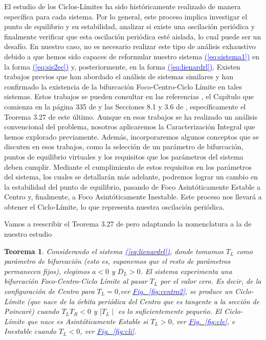 \documentclass[12pt,a4paper]{report} %
\newtheorem{theorem}{Teorema}[chapter]
\newcommand{\fref}[1]{\hyperref[#1]{\textcolor{blue}{Fig.~\ref*{#1}}}}
\newcommand{\eref}[1]{\hyperref[#1]{\textcolor{blue}{(\ref*{#1})}}}
\newcommand{\fref}[1]{\hyperref[#1]{\textcolor{blue}{\textit{Fig.~\ref*{#1}}}}}
\newcommand{\eref}[1]{\hyperref[#1]{\textcolor{blue}{\textit{(\ref*{#1})}}}}
\begin{document}
	\vspace{0.5cm}El estudio de los Ciclos-Límites ha sido históricamente realizado de manera específica para cada sistema. Por lo general, este proceso implica investigar el punto de equilibrio y su estabilidad, analizar si existe una oscilación periódica y finalmente verificar que esta oscilación periódica esté aislada, lo cual puede ser un desafío. En nuestro caso, no es necesario realizar este tipo de análisis exhaustivo debido a que hemos sido capaces de reformular nuestro sistema \eref{eq:sistema1} en la forma \eref{eq:sis2ec} y, posteriormente, en la forma \eref{eq:lienardrl}. Existen trabajos previos que han abordado el análisis de sistemas similares y han confirmado la existencia de la bifurcación Foco-Centro-Ciclo Límite en tales sistemas. Estos trabajos se pueden consultar en las referencias \cite{ponce}, el Capítulo que comienza en la página 335 de \cite{ciclolimite} y las Secciones 8.1 y 3.6 de \cite{amarillo}, específicamente el Teorema 3.27 de este último. Aunque en esos trabajos se ha realizado un análisis convencional del problema, nosotros aplicaremos la Caracterización Integral que hemos explorado previamente. Además, incorporaremos algunos conceptos que se discuten en esos trabajos, como la selección de un parámetro de bifurcación, puntos de equilibrio virtuales y los requisitos que los parámetros del sistema deben cumplir. Mediante el cumplimiento de estos requisitos en los parámetros del sistema, los cuales se detallarán más adelante, podremos lograr un cambio en la estabilidad del punto de equilibrio, pasando de Foco Asintóticamente Estable a Centro y, finalmente, a Foco Asintóticamente Inestable. Este proceso nos llevará a obtener el Ciclo-Límite, lo que representa nuestra oscilación periódica.
	
	\newpage
	
	\vspace{0.5cm} Vamos a reescribir el Teorema 3.27 de \cite{amarillo} pero adaptando la nomenclatura a la de nuestro estudio
	
	\begin{theorem}
		\label{teo:5.1}
		Considerando el sistema \eref{eq:lienardrl}, donde tomamos $T_L$ como parámetro de bifurcación (esto es, suponemos que el resto de parámetros permanecen fijos), elegimos $a<0$ y $D_L>0$. El sistema experimenta una bifurcación Foco-Centro-Ciclo Límite al pasar $T_L$ por el valor cero. Es decir, de la configuración de Centro para $T_L=0$,ver \fref{fig:centro2}, se produce un Ciclo-Límite (que nace de la órbita periódica del Centro que es tangente a la sección de Poincarè) cuando $T_L T_R<0$ y $\mid T_L \mid$ es lo suficientemente pequeño. El Ciclo-Límite que nace es Asintóticamente Estable si $T_L>0$, ver \fref{fig:cle}, e Inestable cuando $T_L<0$, ver \fref{fig:cli}.
	\end{theorem}
	
\end{document}
